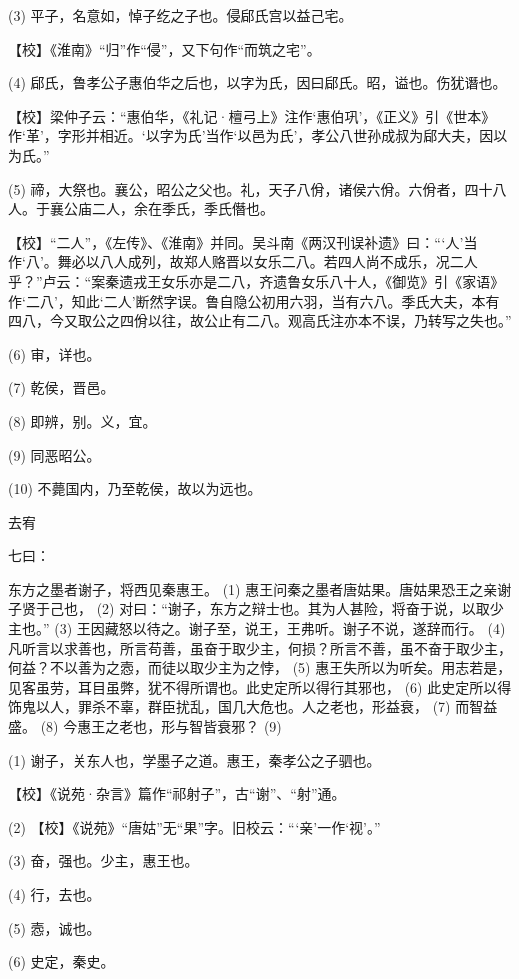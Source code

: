 \documentclass[12pt,UTF8]{ctexbook}
\begin{document}
(3) 平子，名意如，悼子纥之子也。侵郈氏宫以益己宅。

【校】《淮南》“归”作“侵”，又下句作“而筑之宅”。

(4) 郈氏，鲁孝公子惠伯华之后也，以字为氏，因曰郈氏。昭，谥也。伤犹谮也。

【校】梁仲子云：“惠伯华，《礼记·檀弓上》注作‘惠伯巩’，《正义》引《世本》作‘革’，字形并相近。‘以字为氏’当作‘以邑为氏’，孝公八世孙成叔为郈大夫，因以为氏。”

(5) 禘，大祭也。襄公，昭公之父也。礼，天子八佾，诸侯六佾。六佾者，四十八人。于襄公庙二人，余在季氏，季氏僭也。

【校】“二人”，《左传》、《淮南》并同。吴斗南《两汉刊误补遗》曰：“‘人’当作‘八’。舞必以八人成列，故郑人赂晋以女乐二八。若四人尚不成乐，况二人乎？”卢云：“案秦遗戎王女乐亦是二八，齐遗鲁女乐八十人，《御览》引《家语》作‘二八’，知此‘二人’断然字误。鲁自隐公初用六羽，当有六八。季氏大夫，本有四八，今又取公之四佾以往，故公止有二八。观高氏注亦本不误，乃转写之失也。”

(6) 审，详也。

(7) 乾侯，晋邑。

(8) 即辨，别。义，宜。

(9) 同恶昭公。

(10) 不薨国内，乃至乾侯，故以为远也。





去宥


七曰：

东方之墨者谢子，将西见秦惠王。 (1) 惠王问秦之墨者唐姑果。唐姑果恐王之亲谢子贤于己也， (2) 对曰：“谢子，东方之辩士也。其为人甚险，将奋于说，以取少主也。” (3) 王因藏怒以待之。谢子至，说王，王弗听。谢子不说，遂辞而行。 (4) 凡听言以求善也，所言苟善，虽奋于取少主，何损？所言不善，虽不奋于取少主，何益？不以善为之悫，而徒以取少主为之悖， (5) 惠王失所以为听矣。用志若是，见客虽劳，耳目虽弊，犹不得所谓也。此史定所以得行其邪也， (6) 此史定所以得饰鬼以人，罪杀不辜，群臣扰乱，国几大危也。人之老也，形益衰， (7) 而智益盛。 (8) 今惠王之老也，形与智皆衰邪？ (9)

(1) 谢子，关东人也，学墨子之道。惠王，秦孝公之子驷也。

【校】《说苑·杂言》篇作“祁射子”，古“谢”、“射”通。

(2) 【校】《说苑》“唐姑”无“果”字。旧校云：“‘亲’一作‘视’。”

(3) 奋，强也。少主，惠王也。

(4) 行，去也。

(5) 悫，诚也。

(6) 史定，秦史。
\end{document}
